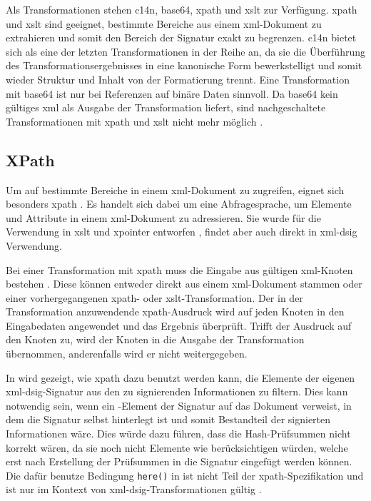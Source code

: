 Als Transformationen stehen \gls{c14n}, \gls{base64}, \gls{xpath} und \gls{xslt} zur Verfügung. \gls{xpath} und \gls{xslt} sind geeignet, bestimmte Bereiche aus
einem \gls{xml}-Dokument zu extrahieren und somit den Bereich der Signatur exakt zu begrenzen. \gls{c14n} bietet sich als eine der letzten
Transformationen in der Reihe an, da sie die Überführung des Transformationsergebnisses in eine kanonische Form bewerkstelligt und somit wieder Struktur und
Inhalt von der Formatierung trennt. Eine Transformation mit \gls{base64} ist nur bei Referenzen auf binäre Daten sinnvoll. Da \gls{base64} kein gültiges
\gls{xml} als Ausgabe der Transformation liefert, sind nachgeschaltete Transformationen mit \gls{xpath} und \gls{xslt} nicht mehr möglich \cite{xml-dsig:w3c}.

\subsection{XPath}
\label{sec:XML-DSig:Transformationen:XPath}
Um auf bestimmte Bereiche in einem \gls{xml}-Dokument zu zugreifen, eignet sich besonders \gls{xpath} \cite{xml:oreilly}. Es handelt sich dabei um eine
Abfragesprache, um Elemente und Attribute in einem \gls{xml}-Dokument zu adressieren. Sie wurde für die Verwendung in \gls{xslt} und \gls{xpointer} entworfen
\cite{xpath:w3c}, findet aber auch direkt in \gls{xml-dsig} Verwendung.

Bei einer Transformation mit \gls{xpath} muss die Eingabe aus gültigen \gls{xml}-Knoten bestehen \cite{xml-dsig:w3c}. Diese können entweder direkt aus einem
\gls{xml}-Dokument stammen oder einer vorhergegangenen \gls{xpath}- oder \gls{xslt}-Transformation. Der in der Transformation anzuwendende \gls{xpath}-Ausdruck
wird auf jeden Knoten in den Eingabedaten angewendet und das Ergebnis überprüft. Trifft der Ausdruck auf den Knoten zu, wird der Knoten in die Ausgabe der
Transformation übernommen, anderenfalls wird er nicht weitergegeben.



In  wird gezeigt, wie \gls{xpath} dazu benutzt werden kann, die Elemente der eigenen \gls{xml-dsig}-Signatur aus den zu
signierenden Informationen zu filtern. Dies kann notwendig sein, wenn ein -Element der Signatur auf das Dokument verweist, in dem die
Signatur selbst hinterlegt ist und somit Bestandteil der signierten Informationen wäre. Dies würde dazu führen, dass die Hash-Prüfsummen nicht korrekt wären, da
sie noch nicht Elemente wie  berücksichtigen würden, welche erst nach Erstellung der Prüfsummen in die Signatur eingefügt werden können.
Die dafür benutze Bedingung \texttt{here()} in  ist nicht Teil der \gls{xpath}-Spezifikation und ist nur im Kontext
von \gls{xml-dsig}-Transformationen gültig \cite{xml-dsig:w3c}.


